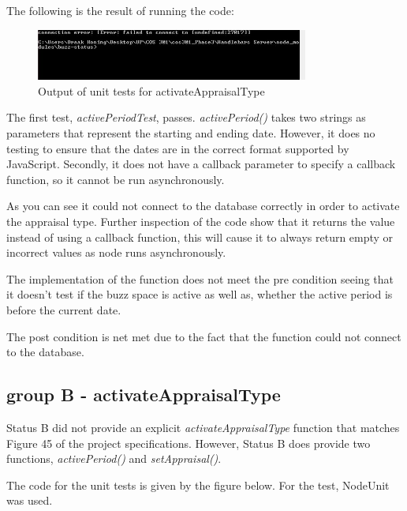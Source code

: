 \documentclass[a4paper,12pt]{article}
\begin{document}
The following is the result of running the code:

	\begin{figure}[H]
		\centering
		\includegraphics[width=0.8\textwidth]{Figures/activateTypeAResult.JPG}
		\caption{Output of unit tests for activateAppraisalType}
	\end{figure}

The first test, \textit{activePeriodTest}, passes. \textit{activePeriod()} takes two strings as parameters that represent the starting and ending date. However, it does no testing to ensure that the dates are in the correct format supported by JavaScript. Secondly, it does not have a callback parameter to specify a callback function, so it cannot be run asynchronously.

As you can see it could not connect to the database correctly in order to activate the appraisal type. Further inspection of the code show that it returns the value instead of using a callback function, this will cause it to always return empty or incorrect values as node runs asynchronously.

The implementation of the function does not meet the pre condition seeing that it doesn't test if the buzz space is active as well as, whether the active period is before the current date.

The post condition is net met due to the fact that the function could not connect to the database.

\subsection{group B - activateAppraisalType}

Status B did not provide an explicit \textit{activateAppraisalType} function that matches Figure 45 of the project specifications.
However, Status B does provide two functions, \textit{activePeriod()} and \textit{setAppraisal()}.

The code for the unit tests is given by the figure below. For the test, NodeUnit was used.
\end{document}
